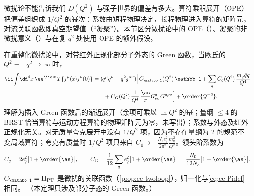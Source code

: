 微扰论不能告诉我们 $D(Q^2)$ 与强子世界的偏差有多大。算符乘积展开（OPE）把偏差组织成 $1/Q^2$ 的幂次：系数由短程物理决定，长程物理进入算符的矩阵元，对流关联函数即真空期望值（“凝聚”）。本节区分微扰论中的 OPE（\tagA）、凝聚的非微扰意义（\tagC）与在复 $q^2$ 处使用 OPE 的额外假设。

\begin{theorem}\label{thm:ee-ope}
在重整化微扰论中，对带红外正规化部分子外态的 Green 函数，当欧氏的 $Q^2=-q^2\to\infty$ 时，
\begin{equation}\label{eq:ee-ope}
\begin{split}
\ii\!\int\!\dd^4x\,\ee^{\ii q\cdot x}\,T\{j^\mu(x)j^\nu(0)\}&=(q^\mu q^\nu-q^2g^{\mu\nu})\Big[C_{\mathbb 1}(Q^2)\,\mathbb 1+\sum_qC_q(Q^2)\,\frac{m_q\bar qq}{Q^4}\\
&\qquad+C_G(Q^2)\,\frac{1}{Q^4}\,\frac{\as}\pi G^a_{\rho\sigma}G^{a\rho\sigma}\Big]+\order{Q^{-6}},
\end{split}
\end{equation}
理解为插入 Green 函数后的渐近展开（余项可乘以 $\ln Q^2$ 的幂；量纲 $\le4$ 的 BRST 恰当算符与运动方程算符的物理矩阵元为零，未写出）；系数与外态及红外正规化无关。对无质量夸克展开中没有 $1/Q^2$ 项，因为不存在量纲为 $2$ 的规范不变局域算符；夸克有质量时 $1/Q^2$ 项只来自 $C_{\mathbb 1}\ni-\frac{N_ce_q^2}{2\pi^2}\frac{m_q^2}{Q^2}$。领头阶系数为
\begin{equation}\label{eq:ee-ope-coeff}
C_q=2e_q^2\big[1+\order{\as}\big],\qquad C_G=\frac1{12}\sum_qe_q^2\big[1+\order{\as}\big]=\frac{R_0}{12N_c}\big[1+\order{\as}\big],
\end{equation}
$C_{\mathbb 1}=\Pi_{\rm PT}$ 是微扰的关联函数（\cref{prop:ee-twoloop}），归一化与\cref{eq:ee-Pidef}相同。%
（本定理只涉及部分子态的 Green 函数。）
\end{theorem}
